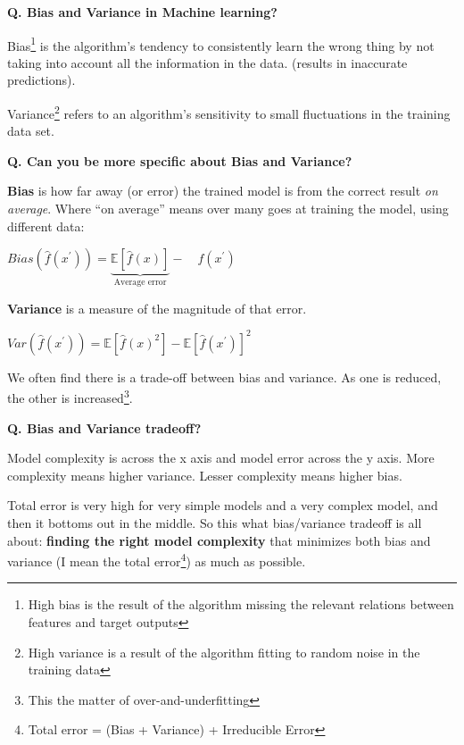 \begin{frame}[fragile]{\textbf{Q. Bias and Variance in Machine learning?}}
  \begin{wideitemize}
    \item Bias\footnote{High bias is the result of the algorithm missing the
    relevant relations between features and target outputs} is the algorithm's
    tendency to consistently learn the wrong thing by not taking into account
    all the information in the data. (results in inaccurate predictions).
    \item Variance\footnote{High variance is a result of the algorithm fitting to
    random noise in the training data} refers to an algorithm's sensitivity
    to small fluctuations in the training data set.
  \end{wideitemize}
\end{frame}

\begin{frame}[fragile]{\textbf{Q. Can you be more specific about Bias and Variance?}}
  \begin{wideitemize}
    \item \textbf{Bias} is how far away (or error) the trained model is from the correct
    result \textit{on average}. Where ``on average'' means over many goes at
    training the model, using different data:
    \begin{wideitemize}
    \item $Bias(\hat{f}(x^{'})) = \underbrace{\mathbb{E}[\hat{f}(x)]}_{\text{Average error}} - \quad f(x^{'})$
    \end{wideitemize}
    \item \textbf{Variance} is a measure of the magnitude of that error.
    \begin{wideitemize}
    \item $Var(\hat{f}(x^{'})) = \mathbb{E}[\hat{f}(x)^{2}] - \mathbb{E}[\hat{f}(x^{'})]^{2}$
    \end{wideitemize}
    \item We often find there is a trade-off between bias and variance. As one is reduced,
    the other is increased\footnote{This the matter of over-and-underfitting}.
  \end{wideitemize}
\end{frame}

\begin{frame}[fragile]{\textbf{Q. Bias and Variance tradeoff?}}
  \begin{wideitemize}
    \item Model complexity is across the x axis and model error across
    the y axis. More complexity means higher variance. Lesser complexity
    means higher bias.
    \item Total error is very high for very simple models and a very complex
    model, and then it bottoms out in the middle. So this what bias/variance
    tradeoff is all about: \textbf{finding the right model complexity} that
    minimizes both bias and variance (I mean the total error\footnote{Total
    error = (Bias + Variance) + Irreducible Error}) as much as possible.
  \end{wideitemize}
\end{frame}

